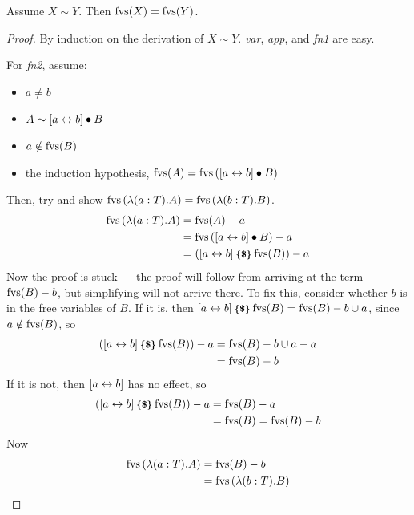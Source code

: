 \begin{lemma}
Assume \(X \sim Y\).
Then \(\mathrm{fvs}(X) = \mathrm{fvs}(Y)\).
\end{lemma}
\begin{proof}
By induction on the derivation of \(X \sim Y\).
\emph{var}, \emph{app}, and \emph{fn1} are easy.

For \emph{fn2}, assume:
\begin{itemize}
\item
\(a \neq b\)
\item
\(A \sim [a \leftrightarrow b] \bullet B\)
\item
\(a \notin \mathrm{fvs}(B)\)
\item
the induction hypothesis, \(\mathrm{fvs}(A) = \mathrm{fvs}\left([a \leftrightarrow b] \bullet B\right)\)
\end{itemize}
Then, try and show \(\mathrm{fvs}\left(\lambda (a:T).A\right) = \mathrm{fvs}\left(\lambda (b:T).B\right)\).
\begin{align*}
\mathrm{fvs}\left(\lambda (a:T).A\right)
&= \mathrm{fvs}(A) - a\\
&= \mathrm{fvs}\left([a \leftrightarrow b] \bullet B\right) - a\\
&= \left([a \leftrightarrow b] \mathbin{\textrm{\footnotesize{\textbf{\{\$\}}}}} \mathrm{fvs}(B)\right) - a\\
\end{align*}
Now the proof is stuck --- the proof will follow from arriving at the term \(\mathrm{fvs}(B) - b\), but simplifying will not arrive there.
To fix this, consider whether \(b\) is in the free variables of \(B\).
If it is, then \([a \leftrightarrow b] \mathbin{\textrm{\footnotesize{\textbf{\{\$\}}}}} \mathrm{fvs}(B) = \mathrm{fvs}(B) - {b} \cup {a}\), since \(a \notin \mathrm{fvs}(B)\), so
\begin{align*}
\left([a \leftrightarrow b] \mathbin{\textrm{\footnotesize{\textbf{\{\$\}}}}} \mathrm{fvs}(B)\right) - a
&= \mathrm{fvs}(B) - {b} \cup {a} - a\\
&= \mathrm{fvs}(B) - b
\end{align*}
If it is not, then \([a \leftrightarrow b]\) has no effect, so
\begin{align*}
\left([a \leftrightarrow b] \mathbin{\textrm{\footnotesize{\textbf{\{\$\}}}}} \mathrm{fvs}(B)\right) - a
&= \mathrm{fvs}(B) - a\\
&= \mathrm{fvs}(B) = \mathrm{fvs}(B) - b
\end{align*}
Now
\begin{align*}
\mathrm{fvs}\left(\lambda (a:T).A\right)
&= \mathrm{fvs}(B) - b\\
&= \mathrm{fvs}\left(\lambda (b:T).B\right)
\end{align*}
\end{proof}

